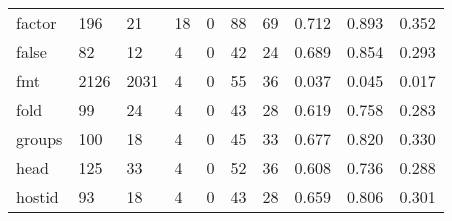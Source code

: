 \begin{longtable}{lp{1.3cm}p{1.3cm}p{1.3cm}p{1.3cm}p{1.3cm}p{1.3cm}p{1.3cm}p{1.3cm}p{1.3cm}}
factor    &                    196 &                                 21 &                                18 &                                0 &                                88 &                              69 &                                0.712 &                                  0.893 &                                0.352 \\
false     &                     82 &                                 12 &                                 4 &                                0 &                                42 &                              24 &                                0.689 &                                  0.854 &                                0.293 \\
fmt       &                   2126 &                               2031 &                                 4 &                                0 &                                55 &                              36 &                                0.037 &                                  0.045 &                                0.017 \\
fold      &                     99 &                                 24 &                                 4 &                                0 &                                43 &                              28 &                                0.619 &                                  0.758 &                                0.283 \\
groups    &                    100 &                                 18 &                                 4 &                                0 &                                45 &                              33 &                                0.677 &                                  0.820 &                                0.330 \\
head      &                    125 &                                 33 &                                 4 &                                0 &                                52 &                              36 &                                0.608 &                                  0.736 &                                0.288 \\
hostid    &                     93 &                                 18 &                                 4 &                                0 &                                43 &                              28 &                                0.659 &                                  0.806 &                                0.301 \\

\end{longtable}
